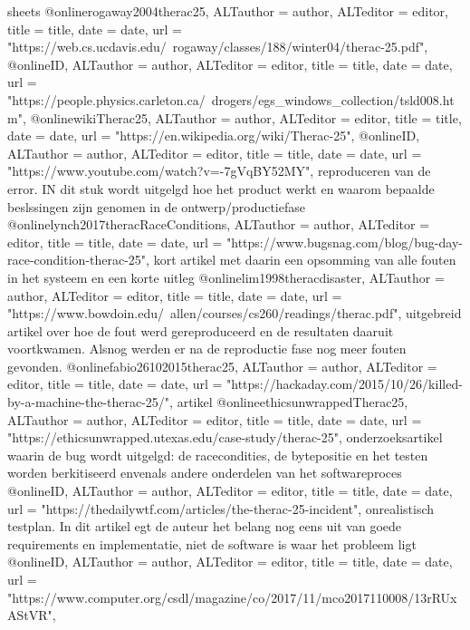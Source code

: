 sheets
@online{rogaway2004therac25,	ALTauthor = {author},	ALTeditor = {editor},	title = {title},	date = {date},	url = {"https://web.cs.ucdavis.edu/~rogaway/classes/188/winter04/therac-25.pdf"},}
\cite{rogaway2004therac25}
@online{ID,	ALTauthor = {author},	ALTeditor = {editor},	title = {title},	date = {date},	url = {"https://people.physics.carleton.ca/~drogers/egs_windows_collection/tsld008.htm"},}
\cite{}
@online{wikiTherac25,	ALTauthor = {author},	ALTeditor = {editor},	title = {title},	date = {date},	url = {"https://en.wikipedia.org/wiki/Therac-25"},}
\cite{wikiTherac25}
@online{ID,	ALTauthor = {author},	ALTeditor = {editor},	title = {title},	date = {date},	url = {"https://www.youtube.com/watch?v=-7gVqBY52MY"},}
\cite{}
reproduceren van de error. IN dit stuk wordt uitgelgd hoe het product werkt en waarom bepaalde beslssingen zijn genomen in de ontwerp/productiefase
@online{lynch2017theracRaceConditions,	ALTauthor = {author},	ALTeditor = {editor},	title = {title},	date = {date},	url = {"https://www.bugsnag.com/blog/bug-day-race-condition-therac-25"},}
\cite{lynch2017theracRaceConditions}
kort artikel met daarin een opsomming van alle fouten in het systeem en een korte uitleg
@online{lim1998theracdisaster,	ALTauthor = {author},	ALTeditor = {editor},	title = {title},	date = {date},	url = {"https://www.bowdoin.edu/~allen/courses/cs260/readings/therac.pdf"},}
\cite{lim1998theracdisaster}
uitgebreid artikel over hoe de fout werd gereproduceerd en de resultaten daaruit voortkwamen. Alsnog werden er na de reproductie fase nog meer fouten gevonden.
@online{fabio26102015therac25,	ALTauthor = {author},	ALTeditor = {editor},	title = {title},	date = {date},	url = {"https://hackaday.com/2015/10/26/killed-by-a-machine-the-therac-25/"},}
\cite{fabio26102015therac25}
artikel
@online{ethicsunwrappedTherac25,	ALTauthor = {author},	ALTeditor = {editor},	title = {title},	date = {date},	url = {"https://ethicsunwrapped.utexas.edu/case-study/therac-25"},}
\cite{ethicsunwrappedTherac25}
onderzoeksartikel waarin de bug wordt uitgelgd: de racecondities, de bytepositie en het testen worden berkitiseerd envenals andere onderdelen van het softwareproces
@online{ID,	ALTauthor = {author},	ALTeditor = {editor},	title = {title},	date = {date},	url = {"https://thedailywtf.com/articles/the-therac-25-incident"},}
\cite{}
onrealistisch testplan. In dit artikel egt de auteur het belang nog eens uit van goede requirements en implementatie, niet de software is waar het probleem ligt
@online{ID,	ALTauthor = {author},	ALTeditor = {editor},	title = {title},	date = {date},	url = {"https://www.computer.org/csdl/magazine/co/2017/11/mco2017110008/13rRUxAStVR"},}
